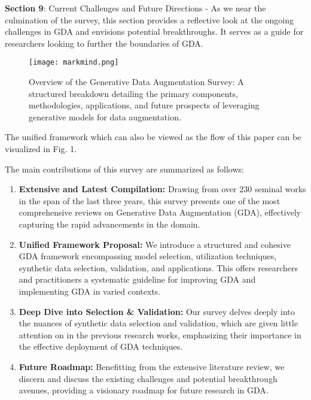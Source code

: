 \documentclass[preprint,12pt,authoryear]{elsarticle}
\begin{document}
\textbf{Section 9}: Current Challenges and Future Directions - As we near the culmination of the survey, this section provides a reflective look at the ongoing challenges in GDA and envisions potential breakthroughs. It serves as a guide for researchers looking to further the boundaries of GDA.

\begin{figure}
    \centering
    \centerline{\texttt{[image: markmind.png]}}
    \caption{Overview of the Generative Data Augmentation Survey: A structured breakdown detailing the primary components, methodologies, applications, and future prospects of leveraging generative models for data augmentation.
}
    \label{fig:enter-label}
\end{figure}

The unified framework which can also be viewed as the flow of this paper can be visualized in Fig. 1.

The main contributions of this survey are summarized as follows:

\begin{enumerate}
    \item \textbf{Extensive and Latest  Compilation:} Drawing from over 230 seminal works in the span of the last three years, this survey presents one of the most comprehensive reviews on Generative Data Augmentation (GDA), effectively capturing the rapid advancements in the domain.
    
    \item \textbf{Unified Framework Proposal:} We introduce a structured and cohesive GDA framework encompassing model selection, utilization techniques, synthetic data selection, validation, and applications. This offers researchers and practitioners a systematic guideline for improving GDA and implementing GDA in varied contexts.
    
    \item \textbf{Deep Dive into Selection \& Validation:}  Our survey delves deeply into the nuances of synthetic data selection and validation, which are given little attention on in the previous research works, emphasizing their importance in the effective deployment of GDA techniques.
    
    \item \textbf{Future Roadmap:} Benefitting from the extensive literature review, we discern and discuss the existing challenges and potential breakthrough avenues, providing a visionary roadmap for future research in GDA.
\end{enumerate}
\end{document}
